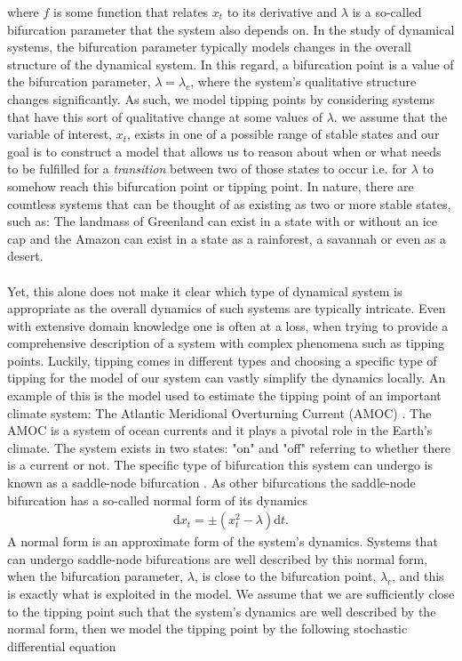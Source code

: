 where $f$ is some function that relates $x_t$ to its derivative and $\lambda$ is a so-called bifurcation parameter that the system also depends on. In the study of dynamical systems, the bifurcation parameter typically models changes in the overall structure of the dynamical system. In this regard, a bifurcation point is a value of the bifurcation parameter, $\lambda = \lambda_c$, where the system's qualitative structure changes significantly. As such, we model tipping points by considering systems that have this sort of qualitative change at some values of $\lambda$. we assume that the variable of interest, $x_t$, exists in one of a possible range of stable states and our goal is to construct a model that allows us to reason about when or what needs to be fulfilled for a \textit{transition} between two of those states to occur i.e. for $\lambda$ to somehow reach this bifurcation point or tipping point. In nature, there are countless systems that can be thought of as existing as two or more stable states, such as: The landmass of Greenland can exist in a state with or without an ice cap and the Amazon can exist in a state as a rainforest, a savannah or even as a desert. \\\\
Yet, this alone does not make it clear which type of dynamical system is appropriate as the overall dynamics of such systems are typically intricate. Even with extensive domain knowledge one is often at a loss, when trying to provide a comprehensive description of a system with complex phenomena such as tipping points. Luckily, tipping comes in different types and choosing a specific type of tipping for the model of our system can vastly simplify the dynamics locally. An example of this is the model used to estimate the tipping point of an important climate system: The Atlantic Meridional Overturning Current (AMOC) \cite{Ditlevsen2023}. The AMOC is a system of ocean currents and it plays a pivotal role in the Earth's climate. The system exists in two states: "on" and "off" referring to whether there is a current or not. The specific type of bifurcation this system can undergo is known as a saddle-node bifurcation \cite{Ditlevsen2023}\cite{Strogatz2019_gv}. As other bifurcations the saddle-node bifurcation has a so-called normal form of its dynamics 
\begin{align}
    \mathrm{d}x_t = \pm\left(x_t^2 - \lambda\right)\mathrm{d}t. \label{eq:normalFormIntroduction}
\end{align}
A normal form is an approximate form of the system's dynamics. Systems that can undergo saddle-node bifurcations are well described by this normal form, when the bifurcation parameter, $\lambda$, is close to the bifurcation point, $\lambda_c$, and this is exactly what is exploited in the model. We assume that we are sufficiently close to the tipping point such that the system's dynamics are well described by the normal form, then we model the tipping point by the following stochastic differential equation
